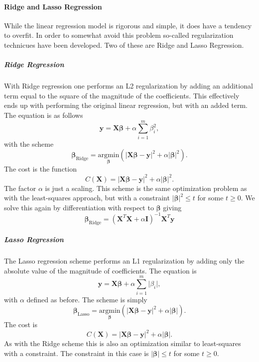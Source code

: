 \documentclass[10pt, t]{beamer}
\begin{document}
\hypertarget{ridge-and-lasso-regression}{%
\paragraph{Ridge and Lasso
Regression}\label{ridge-and-lasso-regression}}

While the linear regression model is rigorous and simple, it does have a
tendency to overfit. In order to somewhat avoid this problem so-called
regularization technicues have been developed. Two of these are Ridge
and Lasso Regression.

\hypertarget{ridge-regression}{%
\subparagraph{Ridge Regression}\label{ridge-regression}}

With Ridge regression one performs an L2 regularization by adding an
additional term equal to the square of the magnitude of the
coefficients. This effectively ends up with performing the original
linear regression, but with an added term. The equation is as follows
\[\boldsymbol{y} = \boldsymbol{X}\boldsymbol{\beta} + \alpha\sum_{i=1}^m\beta^2_i,\]
with the scheme
\[\boldsymbol{\beta}_{\text{Ridge}} = \underset{\boldsymbol{\beta}}{\text{arg}\text{min}}\left({\big|}\boldsymbol{X}\boldsymbol{\beta} - \boldsymbol{y}{\big|}^2 + \alpha{\big|}\boldsymbol{\beta}{\big|}^2\right).\]
The cost is the function
\[C(\boldsymbol{X}) = {\big|}\boldsymbol{X}\boldsymbol{\beta} - \boldsymbol{y}{\big|}^2 + \alpha{\big|}\boldsymbol{\beta}{\big|}^2.\]
The factor \(\alpha\) is just a scaling. This scheme is the same
optimization problem as with the least-squares approach, but with a
constraint \(|\boldsymbol{\beta}|^2\leq t\) for some \(t\geq 0\). We
solve this again by differentiation with respect to
\(\boldsymbol{\beta}\) giving
\[\boldsymbol{\beta}_{\text{Ridge}} = \left(\boldsymbol{X}^T\boldsymbol{X} + \alpha \boldsymbol{I}\right)^{-1}\boldsymbol{X}^T\boldsymbol{y}\]

\hypertarget{lasso-regression}{%
\subparagraph{Lasso Regression}\label{lasso-regression}}

The Lasso regression scheme performs an L1 regularization by adding only
the absolute value of the magnitude of coefficients. The equation is
\[\boldsymbol{y} = \boldsymbol{X}\boldsymbol{\beta} + \alpha\sum_{i=1}^m{\big|}\beta_i{\big|},\]
with \(\alpha\) defined as before. The scheme is simply
\[\boldsymbol{\beta}_{\text{Lasso}} = \underset{\boldsymbol{\beta}}{\text{arg}\text{min}}\left({\big|}\boldsymbol{X}\boldsymbol{\beta} - \boldsymbol{y}{\big|}^2 + \alpha{\big|}\boldsymbol{\beta}{\big|}\right).\]
The cost is
\[C(\boldsymbol{X}) = {\big|}\boldsymbol{X}\boldsymbol{\beta} - \boldsymbol{y}{\big|}^2 + \alpha{\big|}\boldsymbol{\beta}{\big|}.\]
As with the Ridge scheme this is also an optimization similar to
least-squares with a constraint. The constraint in this case is
\(|\boldsymbol{\beta}|\leq t\) for some \(t\geq 0\).
\end{document}
